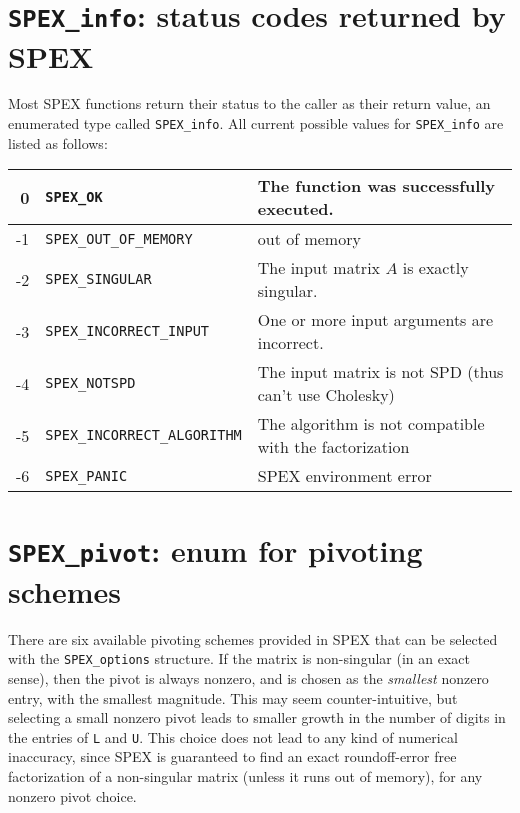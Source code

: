 \documentclass[12pt]{report}
\theoremstyle{definition}
\begin{document}
\section{\texttt{SPEX\_info}: status codes returned by SPEX}
\label{ss:SPEX_info}

Most SPEX functions return their status to the caller as their return value,
an enumerated type called \verb|SPEX_info|. All current possible values for
\verb|SPEX_info| are listed as follows:

\begin{center}
\begin{tabular}{rll}
\hline
    0& \verb|SPEX_OK|& The function was successfully executed.\\
\hline
    -1& \verb|SPEX_OUT_OF_MEMORY|& out of memory\\
\hline
    -2& \verb|SPEX_SINGULAR|& The input matrix $A$ is exactly singular.\\
\hline
    -3& \verb|SPEX_INCORRECT_INPUT|& One or more input arguments are incorrect.\\
\hline
    -4 & \verb|SPEX_NOTSPD| & The input matrix is not SPD (thus can't use Cholesky) \\
\hline
    -5 & \verb|SPEX_INCORRECT_ALGORITHM| & The algorithm is not compatible with the factorization \\
\hline
    -6& \verb|SPEX_PANIC| & SPEX environment error \\
\hline
\end{tabular}
\end{center}

\section{\texttt{SPEX\_pivot}: enum for pivoting schemes}
\label{ss:SPEX_pivot}

There are six available pivoting schemes provided in SPEX that can be
selected with the \verb|SPEX_options| structure.  If the matrix is non-singular
(in an exact sense), then the pivot is always nonzero, and is chosen as the
{\em smallest} nonzero entry, with the smallest magnitude.  This may seem
counter-intuitive, but selecting a small nonzero pivot leads to smaller growth
in the number of digits in the entries of \verb|L| and \verb|U|.  This choice
does not lead to any kind of numerical inaccuracy, since SPEX is guaranteed
to find an exact roundoff-error free factorization of a non-singular matrix
(unless it runs out of memory), for any nonzero pivot choice.
\end{document}

